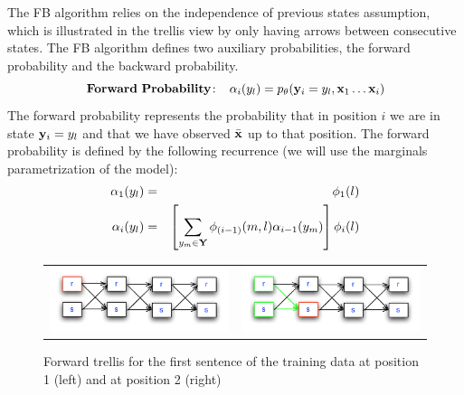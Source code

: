 The FB algorithm relies on the independence of previous states
assumption, which  
is illustrated in the trellis view by only having arrows between consecutive states. 
The FB algorithm defines two auxiliary probabilities, the forward probability and the backward probability. 
\begin{equation}
\label{eq::forward}
\mathbf{Forward \ Probability\!:}\;\;\;\;  \alpha_i({y}_l) = p_{\theta}(\mathbf{y}_i = {y}_l , \mathbf{x}_1 \ldots \mathbf{x}_i)
\end{equation}
The forward probability represents the probability that in position
$i$ we are in state $\mathbf{y}_i = {y}_l$ and that we have observed $\bar{\mathbf{x}}$
up to that position. The forward probability is defined by the
following recurrence (we will use the marginals parametrization of the
model): 
\begin{eqnarray}
\alpha_1({y}_l) &=& \phi_1(l) \\
\alpha_i({y}_l) &=& \left[ \displaystyle \sum_{{y}_m \in \mathbf{Y}} \phi_{(i-1)}(m,l) \alpha_{i-1}({y}_m) \right] \phi_i(l) \label{forwardRecursion}
\end{eqnarray}

\begin{figure}
\begin{center}
\begin{tabular}{cc}

\includegraphics[scale=.5]{figs/sequences/forward1}
& \includegraphics[scale=.5]{figs/sequences/forward2}\\
\end{tabular}
\caption[Forward backward example.]{\label{fig:fb} Forward trellis for
  the first sentence of the training data at position 1 (left) and at
  position 2 (right)}

\end{center}
\end{figure}

